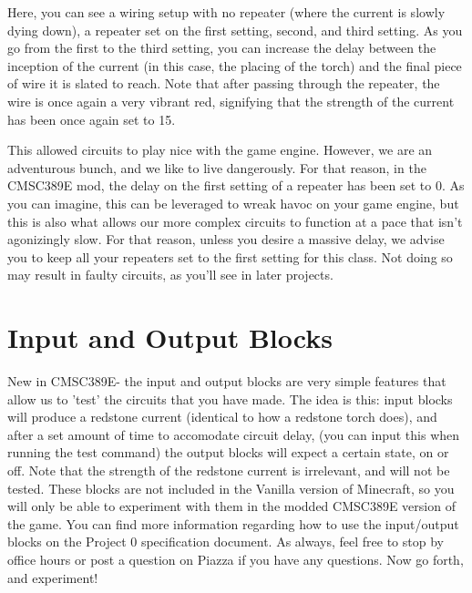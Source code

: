 \documentclass{article}
\begin{document}
    Here, you can see a wiring setup with no repeater (where the current is slowly dying down), a repeater set on the first setting, second, and third setting. As you go from the first to the third setting, you can increase the delay between the inception of the current (in this case, the placing of the torch) and the final piece of wire it is slated to reach. Note that after passing through the repeater, the wire is once again a very vibrant red, signifying that the strength of the current has been once again set to 15.\newline
    
    This allowed circuits to play nice with the game engine. However, we are an adventurous bunch, and we like to live dangerously. For that reason, in the CMSC389E mod, the delay on the first setting of a repeater has been set to 0. As you can imagine, this can be leveraged to wreak havoc on your game engine, but this is also what allows our more complex circuits to function at a pace that isn't agonizingly slow. For that reason, unless you desire a massive delay, we advise you to keep all your repeaters set to the first setting for this class. Not doing so may result in faulty circuits, as you'll see in later projects.
    \newline
    
    \section{Input and Output Blocks}
    
    New in CMSC389E- the input and output blocks are very simple features that allow us to 'test' the circuits that you have made. The idea is this: input blocks will produce a redstone current (identical to how a redstone torch does), and after a set amount of time to accomodate circuit delay, (you can input this when running the test command) the output blocks will expect a certain state, on or off. Note that the strength of the redstone current is irrelevant, and will not be tested.
    \newline\newline
    These blocks are not included in the Vanilla version of Minecraft, so you will only be able to experiment with them in the modded CMSC389E version of the game. You can find more information regarding how to use the input/output blocks on the Project 0 specification document.
    \newline\newline
    As always, feel free to stop by office hours or post a question on Piazza if you have any questions. Now go forth, and experiment!
\end{document}
